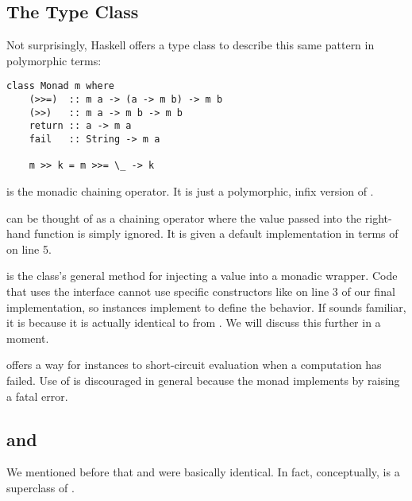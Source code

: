 \subsection{The  Type Class}

Not surprisingly, Haskell offers a type class to describe this same pattern in polymorphic terms:

\begin{lstlisting}
class Monad m where
    (>>=)  :: m a -> (a -> m b) -> m b
    (>>)   :: m a -> m b -> m b
    return :: a -> m a 
    fail   :: String -> m a

    m >> k = m >>= \_ -> k
\end{lstlisting}

\begin{notelist}
    \item \code{(>>=)} is the monadic chaining operator. It is just a polymorphic, infix version of .
    \item \code{(>>)} can be thought of as a chaining operator where the value passed into the right-hand function is simply ignored.
          It is given a default implementation in terms of \code{(>>=)} on line 5.
    \item {} is the  class's general method for injecting a value into a monadic wrapper. Code that uses
          the  interface cannot use specific constructors like  on line 3 of our final 
          implementation, so  instances implement  to define the behavior. If  sounds familiar,
          it is because it is actually identical to  from . We will discuss this further in a moment.
    \item {} offers a way for  instances to short-circuit evaluation when a computation has failed. Use of 
           is discouraged in general because the  monad implements  by raising a fatal error.
\end{notelist}

\subsection{ and }

We mentioned before that  and  were basically identical. In fact, conceptually,
 is a superclass of .

